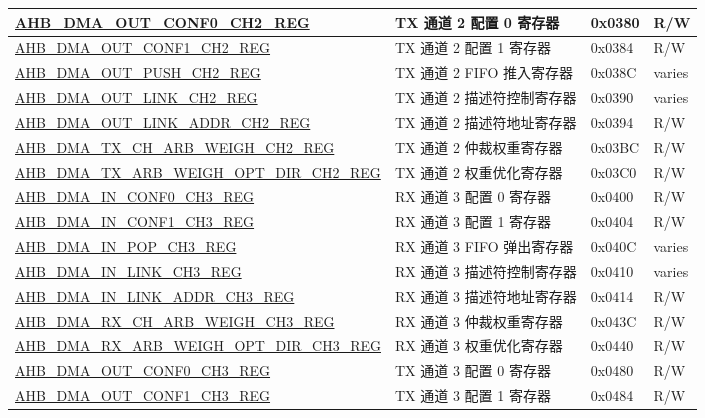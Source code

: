 \begin{longtable}{ | l | l | p{1.3cm} | l | }
\hyperref[regdesc:AHBDMAOUTCONF0CHNREG]{AHB\_DMA\_OUT\_CONF0\_CH2\_REG} & TX 通道 2 配置 0 寄存器 & 0x0380 & R/W    \\ \hline
\hyperref[regdesc:AHBDMAOUTCONF1CHNREG]{AHB\_DMA\_OUT\_CONF1\_CH2\_REG} & TX 通道 2 配置 1 寄存器 & 0x0384 & R/W    \\ \hline
\hyperref[regdesc:AHBDMAOUTPUSHCHNREG]{AHB\_DMA\_OUT\_PUSH\_CH2\_REG} & TX 通道 2 FIFO 推入寄存器 & 0x038C & varies    \\ \hline
\hyperref[regdesc:AHBDMAOUTLINKCHNREG]{AHB\_DMA\_OUT\_LINK\_CH2\_REG} & TX 通道 2 描述符控制寄存器 & 0x0390 & varies    \\ \hline
\hyperref[regdesc:AHBDMAOUTLINKADDRCHNREG]{AHB\_DMA\_OUT\_LINK\_ADDR\_CH2\_REG} & TX 通道 2 描述符地址寄存器 & 0x0394 & R/W    \\ \hline
\hyperref[regdesc:AHBDMATXCHARBWEIGHCHNREG]{AHB\_DMA\_TX\_CH\_ARB\_WEIGH\_CH2\_REG} & TX 通道 2 仲裁权重寄存器 & 0x03BC & R/W    \\ \hline
\hyperref[regdesc:AHBDMATXARBWEIGHOPTDIRCHNREG]{AHB\_DMA\_TX\_ARB\_WEIGH\_OPT\_DIR\_CH2\_REG} & TX 通道 2 权重优化寄存器 & 0x03C0 & R/W    \\ \hline
\hyperref[regdesc:AHBDMAINCONF0CHNREG]{AHB\_DMA\_IN\_CONF0\_CH3\_REG} & RX 通道 3 配置 0 寄存器 & 0x0400 & R/W    \\ \hline
\hyperref[regdesc:AHBDMAINCONF1CHNREG]{AHB\_DMA\_IN\_CONF1\_CH3\_REG} & RX 通道 3 配置 1 寄存器 & 0x0404 & R/W    \\ \hline
\hyperref[regdesc:AHBDMAINPOPCHNREG]{AHB\_DMA\_IN\_POP\_CH3\_REG} & RX 通道 3 FIFO 弹出寄存器 & 0x040C & varies    \\ \hline
\hyperref[regdesc:AHBDMAINLINKCHNREG]{AHB\_DMA\_IN\_LINK\_CH3\_REG} & RX 通道 3 描述符控制寄存器 & 0x0410 & varies    \\ \hline
\hyperref[regdesc:AHBDMAINLINKADDRCHNREG]{AHB\_DMA\_IN\_LINK\_ADDR\_CH3\_REG} & RX 通道 3 描述符地址寄存器 & 0x0414 & R/W    \\ \hline
\hyperref[regdesc:AHBDMARXCHARBWEIGHCHNREG]{AHB\_DMA\_RX\_CH\_ARB\_WEIGH\_CH3\_REG} & RX 通道 3 仲裁权重寄存器 & 0x043C & R/W    \\ \hline
\hyperref[regdesc:AHBDMARXARBWEIGHOPTDIRCHNREG]{AHB\_DMA\_RX\_ARB\_WEIGH\_OPT\_DIR\_CH3\_REG} & RX 通道 3 权重优化寄存器 & 0x0440 & R/W    \\ \hline
\hyperref[regdesc:AHBDMAOUTCONF0CHNREG]{AHB\_DMA\_OUT\_CONF0\_CH3\_REG} & TX 通道 3 配置 0 寄存器 & 0x0480 & R/W    \\ \hline
\hyperref[regdesc:AHBDMAOUTCONF1CHNREG]{AHB\_DMA\_OUT\_CONF1\_CH3\_REG} & TX 通道 3 配置 1 寄存器 & 0x0484 & R/W    \\ \hline

\end{longtable}
